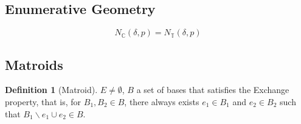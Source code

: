 \documentclass{article}
\theoremstyle{definition}
\newtheorem*{defn}{Definition}
\newcommand{\C}{\mathbb{C}}
\newcommand{\T}{\mathbb{T}}
\begin{document}
\subsection{Enumerative Geometry}
$$
N_\C(\delta,p)=N_\T(\delta,p)
$$
\subsection{Matroids}
\begin{defn}[Matroid]
	$E\neq\emptyset$, $B$ a set of bases that satisfies the Exchange property, that is, for $B_1,B_2\in B$, there always exists $e_1\in B_1$ and $e_2\in B_2$ such that $B_1\backslash e_1\cup e_2\in B$.
\end{defn}

\end{document}
